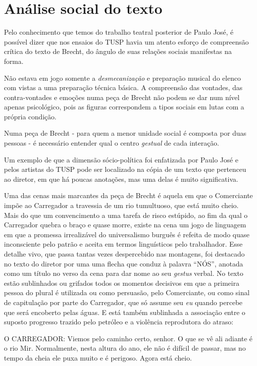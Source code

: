 \section{Análise social do texto}

Pelo conhecimento que temos do trabalho teatral posterior de Paulo José,
é possível dizer que nos ensaios do TUSP havia um atento esforço de
compreensão crítica do texto de Brecht, do ângulo de suas relações
sociais manifestas na forma.

Não estava em jogo somente a \textit{desmecanização} e preparação musical
do elenco com vistas a uma preparação técnica básica. A compreensão das
vontades, das contra-vontades e emoções numa peça de Brecht não podem se
dar num nível apenas psicológico, pois as figuras correspondem a tipos
sociais em lutas com a própria condição.

Numa peça de Brecht - para quem a menor unidade social é composta por
duas pessoas - é necessário entender qual o centro \textit{gestual} de cada
interação.

Um exemplo de que a dimensão sócio-política foi enfatizada por Paulo
José e pelos artistas do TUSP pode ser localizado na cópia de um texto
que pertenceu ao diretor, em que há poucas anotações, mas uma delas é
muito significativa.

Uma das cenas mais marcantes da peça de Brecht é aquela em que o
Comerciante impõe ao Carregador a travessia de um rio tumultuoso, que
está muito cheio. Mais do que um convencimento a uma tarefa de risco
estúpido, ao fim da qual o Carregador quebra o braço e quase morre,
existe na cena um jogo de linguagem em que a promessa irrealizável do
universalismo burguês é refeita de modo quase inconsciente pelo patrão e
aceita em termos linguísticos pelo trabalhador. Esse detalhe vivo, que
passa tantas vezes despercebido nas montagens, foi destacado no texto do
diretor por uma uma flecha que conduz à palavra “NÓS”, anotada como um
título no verso da cena para dar nome ao seu \textit{gestus} verbal. No
texto estão sublinhados ou grifados todos os momentos decisivos em que a
primeira pessoa do plural é utilizada ou como persuasão, pelo
Comerciante, ou como sinal de capitulação por parte do Carregador, que
só assume seu \textit{eu} quando percebe que será encoberto pelas águas. E
está também sublinhada a associação entre o suposto progresso trazido
pelo petróleo e a violência reprodutora do atraso:

O CARREGADOR: Viemos pelo caminho certo, senhor. O que se vê ali adiante
é o rio Mir. Normalmente, nesta altura do ano, ele não é difícil de
passar, mas no tempo da cheia ele puxa muito e é perigoso. Agora está
cheio.


